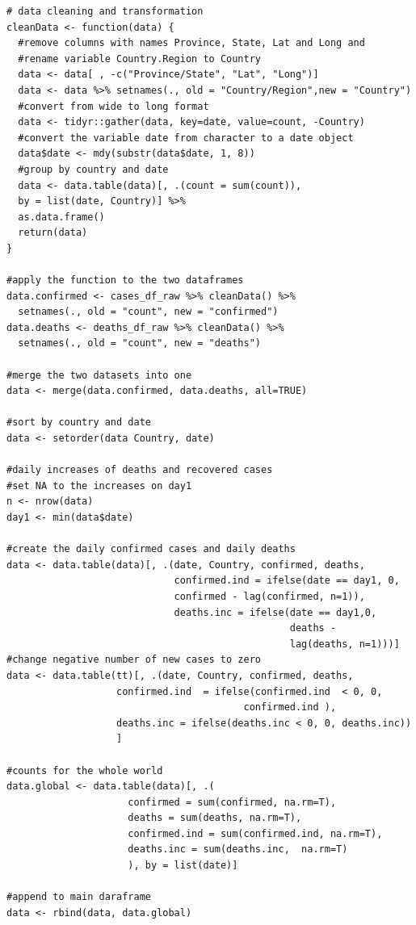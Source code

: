\begin{verbatim}
# data cleaning and transformation
cleanData <- function(data) {
  #remove columns with names Province, State, Lat and Long and 
  #rename variable Country.Region to Country
  data <- data[ , -c("Province/State", "Lat", "Long")]
  data <- data %>% setnames(., old = "Country/Region",new = "Country")
  #convert from wide to long format
  data <- tidyr::gather(data, key=date, value=count, -Country)
  #convert the variable date from character to a date object
  data$date <- mdy(substr(data$date, 1, 8))
  #group by country and date
  data <- data.table(data)[, .(count = sum(count)), 
  by = list(date, Country)] %>%
  as.data.frame()
  return(data)
}

#apply the function to the two dataframes
data.confirmed <- cases_df_raw %>% cleanData() %>% 
  setnames(., old = "count", new = "confirmed")
data.deaths <- deaths_df_raw %>% cleanData() %>% 
  setnames(., old = "count", new = "deaths")

#merge the two datasets into one
data <- merge(data.confirmed, data.deaths, all=TRUE)

#sort by country and date
data <- setorder(data Country, date)

#daily increases of deaths and recovered cases
#set NA to the increases on day1
n <- nrow(data)
day1 <- min(data$date)

#create the daily confirmed cases and daily deaths
data <- data.table(data)[, .(date, Country, confirmed, deaths, 
                             confirmed.ind = ifelse(date == day1, 0,
                             confirmed - lag(confirmed, n=1)),
                             deaths.inc = ifelse(date == day1,0,
                                                 deaths - 
                                                 lag(deaths, n=1)))]
#change negative number of new cases to zero
data <- data.table(tt)[, .(date, Country, confirmed, deaths,
                   confirmed.ind  = ifelse(confirmed.ind  < 0, 0,
                                         confirmed.ind ),
                   deaths.inc = ifelse(deaths.inc < 0, 0, deaths.inc))
                   ]

#counts for the whole world
data.global <- data.table(data)[, .(
                     confirmed = sum(confirmed, na.rm=T),
                     deaths = sum(deaths, na.rm=T),
                     confirmed.ind = sum(confirmed.ind, na.rm=T),
                     deaths.inc = sum(deaths.inc,  na.rm=T)
                     ), by = list(date)]

#append to main daraframe
data <- rbind(data, data.global)
\end{verbatim}

